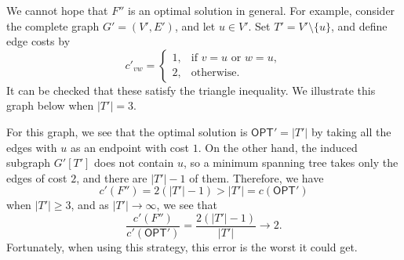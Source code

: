 We cannot hope that $F''$ is an optimal solution in general. For example, 
consider the complete graph $G' = (V', E')$, and let $u \in V'$. Set 
$T' = V' \setminus \{u\}$, and define edge costs by 
\[ c'_{vw} = \begin{cases}
    1, & \text{if } v=u \text{ or } w=u, \\ 
    2, & \text{otherwise.}
\end{cases} \] 
It can be checked that these satisfy the triangle inequality. We illustrate 
this graph below when $|T'| = 3$. 
\begin{center}
\end{center}\vspace{-0.25cm}
For this graph, we see that the optimal solution is $\textsf{OPT}' = 
|T'|$ by taking all the edges with $u$ as an endpoint with cost $1$. 
On the other hand, the induced subgraph $G'[T']$ does not contain $u$, 
so a minimum spanning tree takes only the edges of cost $2$, and there are 
$|T'| - 1$ of them. Therefore, we have 
\[ c'(F'') = 2(|T'| - 1) > |T'| = c(\textsf{OPT}') \] 
when $|T'| \geq 3$, and as $|T'| \to \infty$, we see that 
\[ \frac{c'(F'')}{c'(\textsf{OPT}')} = \frac{2(|T'| - 1)}{|T'|} \to 2. \] 
Fortunately, when using this strategy, this error is the worst it could get.

